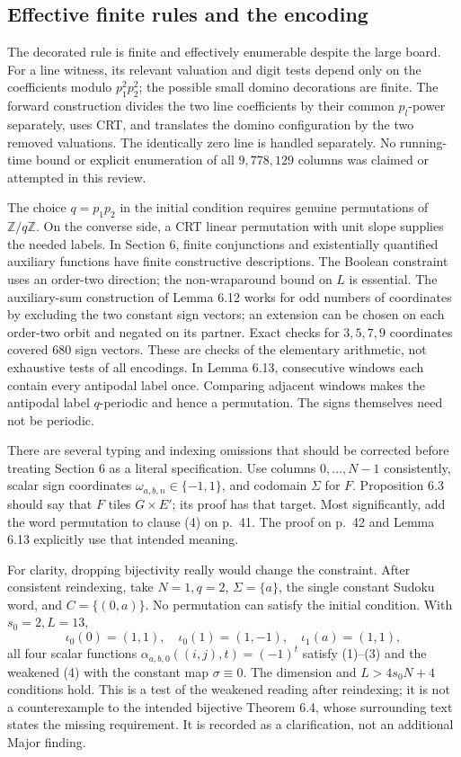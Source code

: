 \documentclass[10pt]{article}
\begin{document}
\subsection*{Effective finite rules and the encoding}
The decorated rule is finite and effectively enumerable despite the large board. For a line witness, its relevant valuation and digit tests depend only on the coefficients modulo \(p_1^2p_2^2\); the possible small domino decorations are finite. The forward construction divides the two line coefficients by their common \(p_l\)-power separately, uses CRT, and translates the domino configuration by the two removed valuations. The identically zero line is handled separately. No running-time bound or explicit enumeration of all \(9,778,129\) columns was claimed or attempted in this review.\par
The choice \(q=p_1p_2\) in the initial condition requires genuine permutations of \(\mathbb Z/q\mathbb Z\). On the converse side, a CRT linear permutation with unit slope supplies the needed labels. In Section 6, finite conjunctions and existentially quantified auxiliary functions have finite constructive descriptions. The Boolean constraint uses an order-two direction; the non-wraparound bound on \(L\) is essential. The auxiliary-sum construction of Lemma 6.12 works for odd numbers of coordinates by excluding the two constant sign vectors; an extension can be chosen on each order-two orbit and negated on its partner. Exact checks for \(3,5,7,9\) coordinates covered 680 sign vectors. These are checks of the elementary arithmetic, not exhaustive tests of all encodings. In Lemma 6.13, consecutive windows each contain every antipodal label once. Comparing adjacent windows makes the antipodal label \(q\)-periodic and hence a permutation. The signs themselves need not be periodic.\par
There are several typing and indexing omissions that should be corrected before treating Section 6 as a literal specification. Use columns \(0,\ldots,N-1\) consistently, scalar sign coordinates \(\omega_{a,b,n}\in\{-1,1\}\), and codomain \(\Sigma\) for \(F\). Proposition 6.3 should say that \(F\) tiles \(G\times E'\); its proof has that target. Most significantly, add the word permutation to clause (4) on p. 41. The proof on p. 42 and Lemma 6.13 explicitly use that intended meaning.\par
For clarity, dropping bijectivity really would change the constraint. After consistent reindexing, take \(N=1,q=2\), \(\Sigma=\{a\}\), the single constant Sudoku word, and \(C=\{(0,a)\}\). No permutation can satisfy the initial condition. With \(s_0=2,L=13\), \[\iota_0(0)=(1,1),\quad \iota_0(1)=(1,-1),\quad
 \iota_1(a)=(1,1),\] all four scalar functions \(\alpha_{a,b,0}((i,j),t)=(-1)^t\) satisfy (1)–(3) and the weakened (4) with the constant map \(\sigma\equiv0\). The dimension and \(L>4s_0N+4\) conditions hold. This is a test of the weakened reading after reindexing; it is not a counterexample to the intended bijective Theorem 6.4, whose surrounding text states the missing requirement. It is recorded as a clarification, not an additional Major finding.\par
\end{document}
